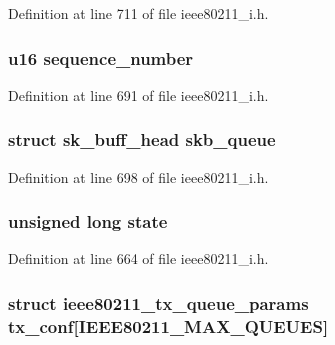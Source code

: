 Definition at line 711 of file ieee80211\-\_\-i.\-h.

\hypertarget{structieee80211__sub__if__data_ac171f7c2d4f67742e044f800ce3ca592}{
\subsubsection[{sequence\-\_\-number}]{\setlength{\rightskip}{0pt plus 5cm}u16 sequence\-\_\-number}}\label{structieee80211__sub__if__data_ac171f7c2d4f67742e044f800ce3ca592}


Definition at line 691 of file ieee80211\-\_\-i.\-h.

\hypertarget{structieee80211__sub__if__data_a6eeb93345e21d69a77a7c2c571bd0000}{
\subsubsection[{skb\-\_\-queue}]{\setlength{\rightskip}{0pt plus 5cm}struct sk\-\_\-buff\-\_\-head skb\-\_\-queue}}\label{structieee80211__sub__if__data_a6eeb93345e21d69a77a7c2c571bd0000}


Definition at line 698 of file ieee80211\-\_\-i.\-h.

\hypertarget{structieee80211__sub__if__data_af7504fc0e249186b115eb5f51a297878}{
\subsubsection[{state}]{\setlength{\rightskip}{0pt plus 5cm}unsigned long state}}\label{structieee80211__sub__if__data_af7504fc0e249186b115eb5f51a297878}


Definition at line 664 of file ieee80211\-\_\-i.\-h.

\hypertarget{structieee80211__sub__if__data_aa80252c8fcedef0fef3d580c68867c84}{
\subsubsection[{tx\-\_\-conf}]{\setlength{\rightskip}{0pt plus 5cm}struct ieee80211\-\_\-tx\-\_\-queue\-\_\-params tx\-\_\-conf\mbox{[}I\-E\-E\-E80211\-\_\-\-M\-A\-X\-\_\-\-Q\-U\-E\-U\-E\-S\mbox{]}}}\label{structieee80211__sub__if__data_aa80252c8fcedef0fef3d580c68867c84}


